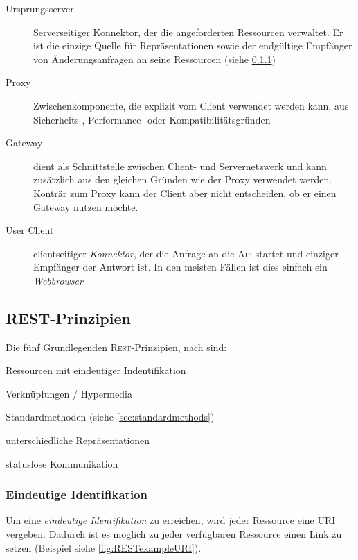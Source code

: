 \begin{description}
    \item[Ursprungsserver] 
        Serverseitiger Konnektor, der die angeforderten Ressourcen verwaltet. Er ist die einzige Quelle für Repräsentationen sowie der endgültige Empfänger von Änderungsanfragen an seine Ressourcen (siehe \cref{sec:unambigiousidentification})
    \item[Proxy] Zwischenkomponente, die explizit vom Client verwendet werden kann, aus Sicherheits-, Performance- oder Kompatibilitätsgründen
    \item[Gateway] dient als Schnittstelle zwischen Client- und Servernetzwerk und kann zusätzlich aus den gleichen Gründen wie der Proxy verwendet werden. Konträr zum Proxy kann der Client aber nicht entscheiden, ob er einen Gateway nutzen möchte.
    \item[User Client] 
        clientseitiger \emph{Konnektor}, der die Anfrage an die \textsc{Api} startet und einziger Empfänger der Antwort ist. In den meisten Fällen ist dies einfach ein \emph{Webbrowser}
\end{description}

\subsection{REST-Prinzipien}

Die fünf Grundlegenden \textsc{Rest}-Prinzipien, nach \cite[11 ff.]{Tilkov09} sind:
\begin{compactitem}
    \item Ressourcen mit eindeutiger Indentifikation
    \item Verknüpfungen / Hypermedia
    \item Standardmethoden (siehe \cref{sec:standardmethods})
    \item unterschiedliche Repräsentationen
    \item statuslose Kommunikation
\end{compactitem}

\subsubsection{Eindeutige Identifikation}
\label{sec:unambigiousidentification}

Um eine \emph{eindeutige Identifikation} zu erreichen, wird jeder Ressource eine \gls{URI} vergeben. Dadurch ist es möglich zu jeder verfügbaren Ressource einen Link zu setzen (Beispiel siehe \cref{fig:RESTexampleURI}).

